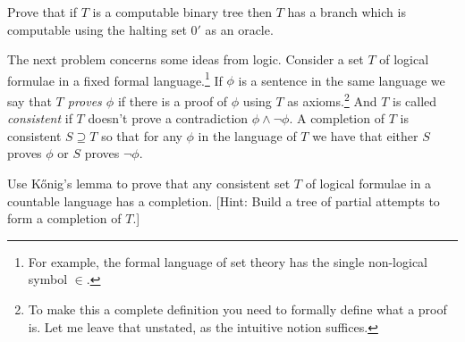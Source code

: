 \documentclass[10pt]{amsart}
\begin{document}
\begin{problem}
Prove that if $T$ is a computable binary tree then $T$ has a branch which is computable using the halting set $0'$ as an oracle.
\end{problem}

The next problem concerns some ideas from logic. Consider a set $T$ of logical formulae in a fixed formal language.\footnote{For example, the formal language of set theory has the single non-logical symbol $\in$.} 
If $\phi$ is a sentence in the same language we say that \emph{$T$ proves $\phi$} if there is a proof of $\phi$ using $T$ as axioms.\footnote{To make this a complete definition you need to formally define what a proof is. Let me leave that unstated, as the intuitive notion suffices.}
And $T$ is called \emph{consistent} if $T$ doesn't prove a contradiction $\phi \land \neg \phi$. A completion of $T$ is consistent $S \supseteq T$ so that for any $\phi$ in the language of $T$ we have that either $S$ proves $\phi$ or $S$ proves $\neg \phi$.

\begin{problem}
Use K\H{o}nig's lemma to prove that any consistent set $T$ of logical formulae in a countable language has a completion. [Hint: Build a tree of partial attempts to form a completion of $T$.]
\end{problem}
\end{document}
